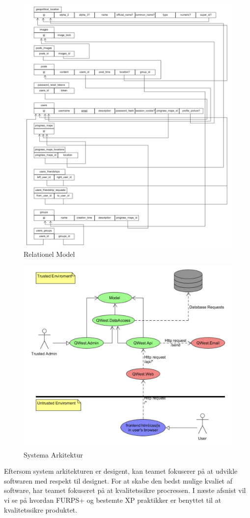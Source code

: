 \begin{figure}
    \includegraphics[width=\linewidth]{figures/RelationelmModel.png}
    \caption{Relationel Model}
    \label{fif:Rela}
\end{figure}



\begin{figure}
    \includegraphics[width=\linewidth]{figures/Systemarkitektur.png}
    \caption{Systema Arkitektur}
    \label{fig:Arki}
\end{figure}


Eftersom system arkitekturen er desigent, kan teamet fokuserer på at udvikle softwaren med respekt til designet. For at skabe den bedst mulige kvaliet af software, har teamet fokuseret på at kvalitetssikre procressen. I næste afsnist vil vi se på hvordan FURPS+ og bestemte XP praktikker er benyttet til at kvalitetssikre produktet. 